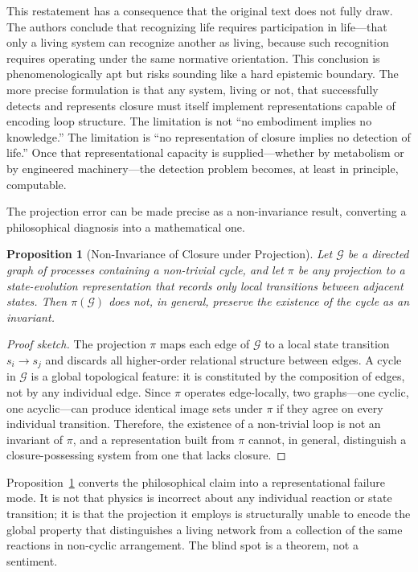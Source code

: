 \documentclass[11pt, a4paper]{article}
\theoremstyle{plain}
\newtheorem{proposition}[theorem]{Proposition}
\theoremstyle{definition}
\theoremstyle{remark}
\begin{document}
This restatement has a consequence that the original text does not fully draw. The authors conclude that recognizing life requires participation in life---that only a living system can recognize another as living, because such recognition requires operating under the same normative orientation. This conclusion is phenomenologically apt but risks sounding like a hard epistemic boundary. The more precise formulation is that any system, living or not, that successfully detects and represents closure must itself implement representations capable of encoding loop structure. The limitation is not ``no embodiment implies no knowledge.'' The limitation is ``no representation of closure implies no detection of life.'' Once that representational capacity is supplied---whether by metabolism or by engineered machinery---the detection problem becomes, at least in principle, computable.

The projection error can be made precise as a non-invariance result, converting a philosophical diagnosis into a mathematical one.

\begin{proposition}[Non-Invariance of Closure under Projection]
\label{prop:noninvariance}
Let $\mathcal{G}$ be a directed graph of processes containing a non-trivial cycle, and let $\pi$ be any projection to a state-evolution representation that records only local transitions between adjacent states. Then $\pi(\mathcal{G})$ does not, in general, preserve the existence of the cycle as an invariant.
\end{proposition}

\begin{proof}[Proof sketch]
The projection $\pi$ maps each edge of $\mathcal{G}$ to a local state transition $s_i \to s_j$ and discards all higher-order relational structure between edges. A cycle in $\mathcal{G}$ is a global topological feature: it is constituted by the composition of edges, not by any individual edge. Since $\pi$ operates edge-locally, two graphs---one cyclic, one acyclic---can produce identical image sets under $\pi$ if they agree on every individual transition. Therefore, the existence of a non-trivial loop is not an invariant of $\pi$, and a representation built from $\pi$ cannot, in general, distinguish a closure-possessing system from one that lacks closure.
\end{proof}

Proposition~\ref{prop:noninvariance} converts the philosophical claim into a representational failure mode. It is not that physics is incorrect about any individual reaction or state transition; it is that the projection it employs is structurally unable to encode the global property that distinguishes a living network from a collection of the same reactions in non-cyclic arrangement. The blind spot is a theorem, not a sentiment.
\end{document}
